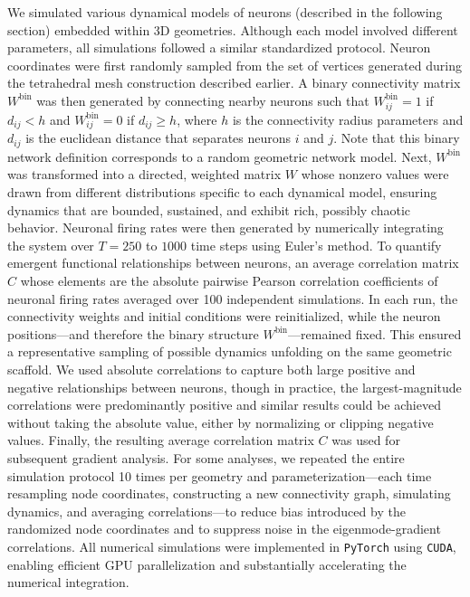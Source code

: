 \documentclass{article}
\begin{document}
We simulated various dynamical models of neurons (described in the following section) embedded within 3D geometries. Although each model involved different parameters, all simulations followed a similar standardized protocol. Neuron coordinates were first randomly sampled from the set of vertices generated during the tetrahedral mesh construction described earlier. A binary connectivity matrix $W^{\text{bin}}$ was then generated by connecting nearby neurons such that $W^{\text{bin}}_{ij}=1$ if $d_{ij} < h$ and $W^{\text{bin}}_{ij}=0$ if $d_{ij} \geq h$, where $h$ is the connectivity radius parameters and $d_{ij}$ is the euclidean distance that separates neurons $i$ and $j$. Note that this binary network definition corresponds to a random geometric network model\cite{penrose2003random}. Next, $W^{\text{bin}}$ was transformed into a directed, weighted matrix $W$ whose nonzero values were drawn from different distributions specific to each dynamical model, ensuring dynamics that are bounded, sustained, and exhibit rich, possibly chaotic behavior. Neuronal firing rates were then generated by numerically integrating the system over $T=250$ to $1000$ time steps using Euler's method. To quantify emergent functional relationships between neurons, an average correlation matrix $C$ whose elements are the absolute pairwise Pearson correlation coefficients of neuronal firing rates averaged over 100 independent simulations. In each run, the connectivity weights and initial conditions were reinitialized, while the neuron positions---and therefore the binary structure $W^{\text{bin}}$---remained fixed. This ensured a representative sampling of possible dynamics unfolding on the same geometric scaffold. We used absolute correlations to capture both large positive and negative relationships between neurons, though in practice, the largest-magnitude correlations were predominantly positive and similar results could be achieved without taking the absolute value, either by normalizing or clipping negative values. Finally, the resulting average correlation matrix $C$ was used for subsequent gradient analysis. For some analyses, we repeated the entire simulation protocol 10 times per geometry and parameterization---each time resampling node coordinates, constructing a new connectivity graph, simulating dynamics, and averaging correlations---to reduce bias introduced by the randomized node coordinates and to suppress noise in the eigenmode-gradient correlations. All numerical simulations were implemented in \verb|PyTorch| using \verb|CUDA|, enabling efficient GPU parallelization and substantially accelerating the numerical integration.
\end{document}
